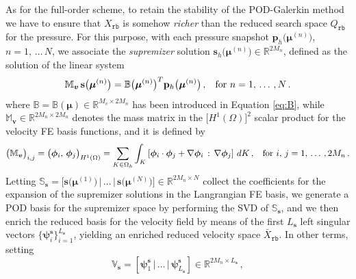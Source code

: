 \documentclass[12pt, a4paper, twoside, openright]{report}
\numberwithin{equation}{chapter}
\theoremstyle{theorem}
\theoremstyle{definition}
\theoremstyle{remark}
\theoremstyle{proposition}
\numberwithin{figure}{chapter}
\newcommand{\bg}[1]{\boldsymbol{#1}}
\begin{document}
		As for the full-order scheme, to retain the stability of the POD-Galerkin method we have to ensure that $X_{\texttt{rb}}$ is somehow \emph{richer} than the reduced search space $Q_{\texttt{rb}}$ for the pressure. For this purpose, with each pressure snapshot $\mathbf{p}_h \big( \bg{\mu}^{(n)} \big)$, $n = 1, \, \ldots \, N$, we associate the \emph{supremizer} solution $\mathbf{s}_h \big( \bg{\mu}^{(n)} \big) \in \mathbb{R}^{2 M_n}$, defined as the solution of the linear system
		\begin{equation}
			\label{eq:supremizer-system}
			\mathbb{M}_{\bg{v}} \, \mathbf{s} \big( \bg{\mu}^{(n)} \big) = \mathbb{B} \big( \bg{\mu}^{(n)} \big)^T \mathbf{p}_h \big( \bg{\mu}^{(n)} \big) \, , \hspace*{0.3cm} \text{for $n = 1, \, \ldots \, , N$} \, .
		\end{equation} 
		where $\mathbb{B} = \mathbb{B}(\bg{\mu}) \in \mathbb{R}^{M_v \times 2 M_n}$ has been introduced in Equation \eqref{eq:B}, while $\mathbb{M}_{\bg{v}} \in \mathbb{R}^{2 M_n \times 2 M_n}$ denotes the mass matrix in the $\big[ H^1(\Omega) \big]^2$ scalar product for the velocity FE basis functions, and it is defined by
		\begin{equation*}
			\big( \mathbb{M}_{\bg{v}} \big)_{i,j} = \big( \bg{\phi}_i, \, \bg{\phi}_j \big)_{H^1(\Omega)} = \sum_{K \in \Omega_h} \int_K \left[ \bg{\phi}_i \cdot \bg{\phi}_j + \nabla \bg{\phi}_i \, : \, \nabla \bg{\phi}_j \right] \, dK \, , \hspace*{0.3cm} \text{for $i, \, j = 1, \, \ldots \, , 2 M_n$} \, .
		\end{equation*}
		Letting $\mathbb{S}_{\bg{s}} = \big[ \mathbf{s} \big( \bg{\mu}^{(1)} \big) \, \big| \, \ldots \, \big| \, \mathbf{s} \big( \bg{\mu}^{(N)} \big) \big] \in \mathbb{R}^{2 M_n \times N}$ collect the coefficients for the expansion of the supremizer solutions in the Langrangian FE basis, we generate a POD basis for the supremizer space by performing the SVD of $\mathbb{S}_{\bg{s}}$, and we then enrich the reduced basis for the velocity field by means of the first $L_{\bg{s}}$ left singular vectors $\big\lbrace \bg{\psi}_i^{\bg{s}} \big\rbrace_{i = 1}^{L_{\bg{s}}}$, yielding an enriched reduced velocity space $\bar{X}_{\texttt{rb}}$. In other terms, setting
		\begin{equation*}
			\mathbb{V}_{\bg{s}} = \left[ \bg{\psi}_1^{\bg{s}} \, \big| \, \ldots \, \big| \, \bg{\psi}_{L_{\bg{s}}}^{\bg{s}} \right] \in \mathbb{R}^{2 M_n \times L_{\bg{s}}} \, ,
		\end{equation*}
\end{document}
